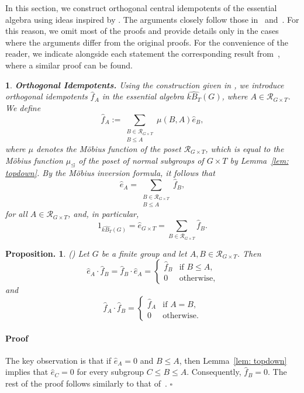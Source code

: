\documentclass[12pt]{article}
\theoremstyle{change}
\newtheorem{prop}[theorem]{Proposition.}
\newtheorem{nothing}[theorem]{}
\newenvironment{proof}{\paragraph{Proof}}{\hfill$\square$}
\newcommand{\calR}{\mathcal{R}}
\newcommand{\1}{{\bf 1}}
\begin{document}
In this section, we construct orthogonal central idempotents of the essential algebra using ideas inspired by \cite{BC}. The arguments closely follow those in~\cite[Section 4]{BC} and~\cite[Section 4]{CM}. For this reason, we omit most of the proofs and provide details only in the cases where the arguments differ from the original proofs. For the convenience of the reader, we indicate alongside each statement the corresponding result from~\cite{BC}, where a similar proof can be found.
\begin{nothing} \textbf{Orthogonal Idempotents.}
Using the construction given in \cite[Section 4.3]{BC}, we introduce orthogonal idempotents $\widehat{f}_A$ in the essential algebra $\widehat{kB_T}(G)$, where $A \in \calR_{G\times T}$.
We define
\begin{equation*}
\widehat{f}_A := \sum_{\substack{B \in \calR_{G\times T} \\ B \leq A}} \mu(B,A)\widehat{e}_B,
\end{equation*}
where $\mu$ denotes the Möbius function of the poset $\calR_{G\times T}$, which is equal to the M\"obius function $\mu_\unlhd$ of the poset of normal subgroups of $G\times T$ by Lemma~\ref{lem: topdown}. By the Möbius inversion formula, it follows that
\begin{equation*}
\widehat{e}_A = \sum_{\substack{B \in \calR_{G\times T} \\ B \leq A}} \widehat{f}_B,
\end{equation*}
for all $A \in \calR_{G\times T}$, and, in particular,
\begin{equation}
\label{eq: sumeqone}
1_{\widehat{kB_T}(G)} =\widehat{e}_{G\times T} = \sum_{B \in \calR_{G\times T}} \widehat{f}_B.
\end{equation}
\end{nothing}

\begin{prop}({\cite[Proposition 4.4]{BC}})
\label{prop: ortipots}
Let $G$ be a finite group and let $A,B \in \calR_{G\times T}$. Then
\begin{equation*}
\widehat{e}_A\cdot \widehat{f}_B = \widehat{f}_B\cdot \widehat{e}_A =
\begin{cases}
\widehat{f}_B & \text{if } B \leq A,\\
0 & \text{otherwise},
\end{cases}
\end{equation*}
and
\begin{equation*}
\widehat{f}_A\cdot \widehat{f}_B =
\begin{cases}
\widehat{f}_A & \text{if } A = B,\\
0 & \text{otherwise}.
\end{cases}
\end{equation*}
\end{prop}
\begin{proof}
The key observation is that if \(\widehat{e}_A=0\) and \(B\leq A\), then Lemma~\ref{lem: topdown} implies that \(\widehat{e}_C=0\) for every subgroup \(C\leq B\leq A\). Consequently, \(\widehat{f}_B=0\). The rest of the proof follows similarly to that of~\cite[Proposition 4.4]{BC}.
\end{proof}
\end{document}

